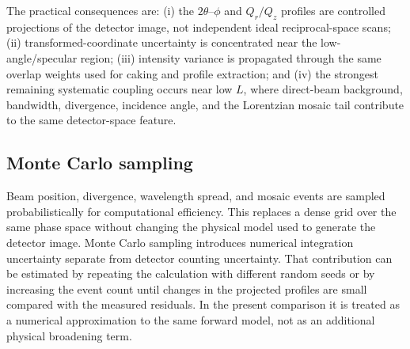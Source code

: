 The practical consequences are: (i) the $2\theta$--$\phi$ and $Q_r/Q_z$ profiles are controlled projections of the detector image, not independent ideal reciprocal-space scans; (ii) transformed-coordinate uncertainty is concentrated near the low-angle/specular region; (iii) intensity variance is propagated through the same overlap weights used for caking and profile extraction; and (iv) the strongest remaining systematic coupling occurs near low $L$, where direct-beam background, bandwidth, divergence, incidence angle, and the Lorentzian mosaic tail contribute to the same detector-space feature.

\subsection{Monte Carlo sampling}

Beam position, divergence, wavelength spread, and mosaic events are sampled probabilistically for computational efficiency. This replaces a dense grid over the same phase space without changing the physical model used to generate the detector image. Monte Carlo sampling introduces numerical integration uncertainty separate from detector counting uncertainty. That contribution can be estimated by repeating the calculation with different random seeds or by increasing the event count until changes in the projected profiles are small compared with the measured residuals. In the present comparison it is treated as a numerical approximation to the same forward model, not as an additional physical broadening term.
